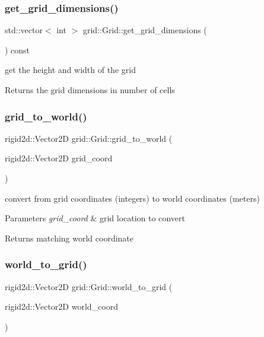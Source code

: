 \subsubsection{\texorpdfstring{get\+\_\+grid\+\_\+dimensions()}{get\_grid\_dimensions()}}
{\footnotesize\ttfamily std\+::vector$<$ int $>$ grid\+::\+Grid\+::get\+\_\+grid\+\_\+dimensions (\begin{DoxyParamCaption}{ }\end{DoxyParamCaption}) const}



get the height and width of the grid 

\begin{DoxyReturn}{Returns}
the grid dimensions in number of cells 
\end{DoxyReturn}
\mbox{\label{classgrid_1_1Grid_a740d72189efbdf5595c3ddaacc8cdfc4}} 
\subsubsection{\texorpdfstring{grid\+\_\+to\+\_\+world()}{grid\_to\_world()}}
{\footnotesize\ttfamily rigid2d\+::\+Vector2D grid\+::\+Grid\+::grid\+\_\+to\+\_\+world (\begin{DoxyParamCaption}\item[{rigid2d\+::\+Vector2D}]{grid\+\_\+coord }\end{DoxyParamCaption})}



convert from grid coordinates (integers) to world coordinates (meters) 


\begin{DoxyParams}{Parameters}
{\em grid\+\_\+coord} & grid location to convert \\
\hline
\end{DoxyParams}
\begin{DoxyReturn}{Returns}
matching world coordinate 
\end{DoxyReturn}
\mbox{\label{classgrid_1_1Grid_a9aeb33485b294ab4a07178359db6e3cf}} 
\subsubsection{\texorpdfstring{world\+\_\+to\+\_\+grid()}{world\_to\_grid()}}
{\footnotesize\ttfamily rigid2d\+::\+Vector2D grid\+::\+Grid\+::world\+\_\+to\+\_\+grid (\begin{DoxyParamCaption}\item[{rigid2d\+::\+Vector2D}]{world\+\_\+coord }\end{DoxyParamCaption})}



